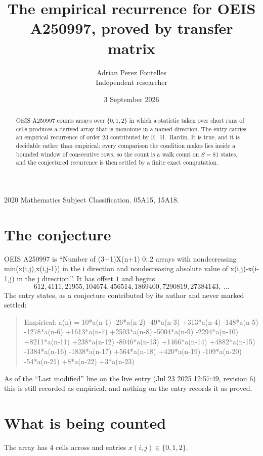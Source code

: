 \documentclass[11pt,a4paper]{article}
\title{The empirical recurrence for OEIS A250997, proved by transfer matrix}
\author{Adrian Perez Fontelles\\ \small Independent researcher}
\date{3 September 2026}
\theoremstyle{plain}
\theoremstyle{definition}
\begin{document}
\maketitle

\begin{abstract}
OEIS A250997 counts arrays over $\{0,1,2\}$ in which a statistic taken over short runs
of cells produces a derived array that is monotone in a named direction. The entry carries an
empirical recurrence of order $23$ contributed by R.~H.~Hardin. It is true, and it is
decidable rather than empirical: every comparison the condition makes lies inside a bounded
window of consecutive rows, so the count is a walk count on $S=81$ states, and the
conjectured recurrence is then settled by a finite exact computation.
\end{abstract}

\noindent\small 2020 Mathematics Subject Classification. 05A15, 15A18.\normalsize

\section{The conjecture}

OEIS A250997 is ``Number of (3+1)X(n+1) 0..2 arrays with nondecreasing min(x(i,j),x(i,j-1)) in the i direction and nondecreasing absolute value of x(i,j)-x(i-1,j) in the j direction.''. It has offset $1$ and begins
\[
612, 4111, 21955, 104674, 456514, 1869400, 7290819, 27384143,\ \dots
\]
The entry states, as a conjecture contributed by its author and never marked settled:
\begin{quote}
Empirical: a(n) = 10*a(n-1) -26*a(n-2) -49*a(n-3) +313*a(n-4) -148*a(n-5) -1278*a(n-6) +1613*a(n-7) +2503*a(n-8) -5004*a(n-9) -2294*a(n-10) +8211*a(n-11) +238*a(n-12) -8046*a(n-13) +1466*a(n-14) +4882*a(n-15) -1384*a(n-16) -1838*a(n-17) +564*a(n-18) +420*a(n-19) -109*a(n-20) -54*a(n-21) +8*a(n-22) +3*a(n-23)
\end{quote}
As of the ``Last modified'' line on the live entry (Jul 23 2025 12:57:49, revision 6) this is still
recorded as empirical, and nothing on the entry records it as proved.

\section{What is being counted}

The array has $4$ cells across and entries $x(i,j)\in\{0,1,2\}$.
\end{document}
